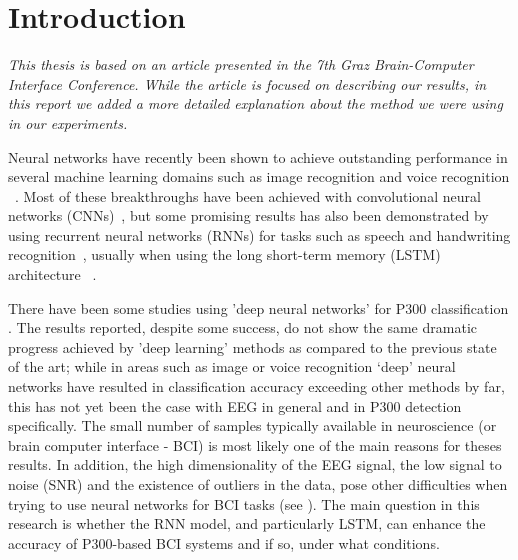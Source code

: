 \documentclass[
12pt, %
english, %
doublespacing, %
headsepline, %
]{MastersDoctoralThesis} %
\begin{document}
\mainmatter %

\pagestyle{thesis} %



\chapter{Introduction}

\vspace{0.4cm}


\textit{This thesis is based on an article presented in the 7th Graz Brain-Computer Interface Conference. While the article  is focused on describing our results, in this report we added a more detailed explanation about the method we were using in our experiments.}

Neural networks have recently been shown to achieve outstanding performance in several machine learning domains such as image recognition \cite{krizhevsky2012imagenet} and voice recognition ~\cite{hinton2012deep}. Most of these breakthroughs have been achieved with convolutional neural networks (CNNs)~\cite{Lenet98}, but some promising results has also been demonstrated by using recurrent neural networks (RNNs) for tasks such as speech and handwriting recognition~\cite{graves2013speech, graves2008unconstrained}, usually when using the long short-term memory (LSTM) architecture ~\cite{LSTM_origin}.

There have been some studies using 'deep neural networks' for P300 classification \cite{P300_CNN, RSVP_P300_geva}. The results reported, despite some success, do not show the same dramatic progress achieved by 'deep learning' methods as compared to the previous state of the art; while in areas such as image or voice recognition `deep' neural networks have resulted in classification accuracy exceeding other methods by far, this has not yet been the case with EEG in general and in P300 detection specifically. The small number of samples typically available in neuroscience (or brain computer interface - BCI) is most likely one of the main reasons for theses results. In addition, the high dimensionality of the EEG signal, the low signal to noise (SNR) and the existence of outliers in the data, pose other difficulties when trying to use neural networks for BCI tasks (see \cite{lotte2007review}). The main question in this research is whether the RNN model, and particularly LSTM, can enhance the accuracy of P300-based BCI systems and if so, under what conditions.
\end{document}
